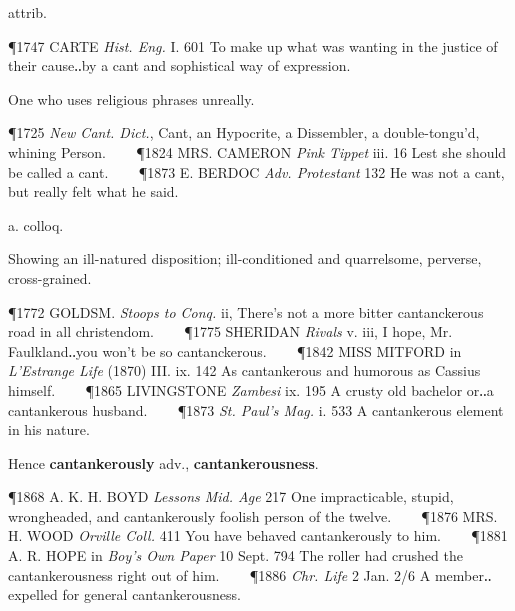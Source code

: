 \begin{description}[wide, labelwidth=!, labelindent=0pt]
\begin{myenumerate}
 attrib.

\P 1747 CARTE  \textit{Hist. Eng.} I. 601 To make up what was wanting in the justice of their cause‥by a cant and sophistical way of expression.

 One who uses religious phrases unreally.

\P 1725  \textit{New Cant. Dict.}, Cant, an Hypocrite, a Dissembler, a double-tongu'd, whining Person.    
\P 1824 MRS. CAMERON  \textit{Pink Tippet} iii. 16 Lest she should be called a cant.    
\P 1873 E. BERDOC  \textit{Adv. Protestant} 132 He was not a cant, but really felt what he said.
\end{myenumerate}



 a. colloq.

\noindent {}


\noindent
Showing an ill-natured disposition; ill-conditioned and quarrelsome, perverse, cross-grained.

\P 1772 GOLDSM.  \textit{Stoops to Conq.} ii, There's not a more bitter cantanckerous road in all christendom.    
\P 1775 SHERIDAN  \textit{Rivals} v. iii, I hope, Mr. Faulkland‥you won't be so cantanckerous.    
\P 1842 MISS MITFORD in \textit{L'Estrange Life} (1870) III. ix. 142 As cantankerous and humorous as Cassius himself.    
\P 1865 LIVINGSTONE  \textit{Zambesi} ix. 195 A crusty old bachelor or‥a cantankerous husband.    
\P 1873 \textit{St. Paul's Mag.} i. 533 A cantankerous element in his nature.

\vspace{0.1cm} \noindent
Hence \textbf{cantankerously} adv., \textbf{cantankerousness}.

\P 1868 A. K. H. BOYD  \textit{Lessons Mid. Age} 217 One impracticable, stupid, wrongheaded, and cantankerously foolish person of the twelve.    
\P 1876 MRS. H. WOOD  \textit{Orville Coll.} 411 You have behaved cantankerously to him.    
\P 1881 A. R. HOPE in \textit{Boy's Own Paper} 10 Sept. 794 The roller had crushed the cantankerousness right out of him.    
\P 1886 \textit{Chr. Life} 2 Jan. 2/6 A member‥expelled for general cantankerousness.






\end{description}
